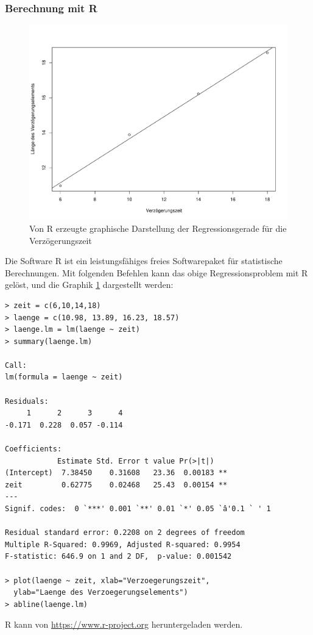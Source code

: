 \subsubsection{Berechnung mit R}
\begin{figure}
\begin{center}
\includegraphics[width=0.7\hsize]{graphics/verzoegerungszeit}
\end{center}
\caption{Von R erzeugte graphische Darstellung der Regressionsgerade
für die Verzögerungszeit\label{verzoegerungszeit}}
\end{figure}
Die Software R
ist ein leistungsfähiges freies Softwarepaket für statistische
Berechnungen.
Mit folgenden Befehlen kann das obige Regressionsproblem
mit R gelöst, und die Graphik \ref{verzoegerungszeit} dargestellt
werden:

{\footnotesize
\begin{verbatim}
> zeit = c(6,10,14,18)
> laenge = c(10.98, 13.89, 16.23, 18.57)
> laenge.lm = lm(laenge ~ zeit)
> summary(laenge.lm)

Call:
lm(formula = laenge ~ zeit)

Residuals:
     1      2      3      4 
-0.171  0.228  0.057 -0.114 

Coefficients:
            Estimate Std. Error t value Pr(>|t|)   
(Intercept)  7.38450    0.31608   23.36  0.00183 **
zeit         0.62775    0.02468   25.43  0.00154 **
---
Signif. codes:  0 `***' 0.001 `**' 0.01 `*' 0.05 `â'0.1 ` ' 1 

Residual standard error: 0.2208 on 2 degrees of freedom
Multiple R-Squared: 0.9969,	Adjusted R-squared: 0.9954 
F-statistic: 646.9 on 1 and 2 DF,  p-value: 0.001542 

> plot(laenge ~ zeit, xlab="Verzoegerungszeit",
  ylab="Laenge des Verzoegerungselements")
> abline(laenge.lm)
\end{verbatim}
}
R kann von \url{https://www.r-project.org} heruntergeladen werden.
